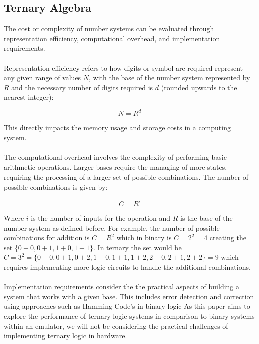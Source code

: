 \documentclass[12pt]{article}
\begin{document}
\subsection{Ternary Algebra}

The cost or complexity of number systems can be evaluated through representation efficiency,
computational overhead, and implementation requirements.\\
\\
Representation efficiency refers to how digits or symbol are required represent any given range of values $N$, with the base of the number system represented 
by $R$ and the necessary number of digits required is $d$ (rounded upwards to the nearest integer):

\begin{equation}
  N = R^{d}
\end{equation}

This directly impacts the memory usage and storage costs in a computing system.\\
\\
The computational overhead involves the complexity of performing basic arithmetic operations. Larger bases require the managing of more states, requiring the 
processing of a larger set of possible combinations. The number of possible combinations is given by:

\begin{equation}
  C = R^{i}
\end{equation}

Where $i$ is the number of inputs for the operation and $R$ is the base of the number system as defined before. For example, the number of possible combinations 
for addition is $C = R^{2}$ which in binary is $C = 2^{2} = 4$ creating the set $\{0+0, 0+1, 1+0, 1+1\}$. 
In ternary the set would be $C = 3^{2} = \{0+0, 0+1, 0+2, 1+0, 1+1, 1+2, 2+0, 2+1, 2+2\} = 9$ which requires implementing more logic circuits to handle the 
additional combinations.\\
\\
Implementation requirements consider the the practical aspects of building a system that works with a given base. This includes 
error detection and correction using approaches such as Hamming Code's in binary logic %
As this paper aims to explore the performance of ternary logic systems in comparison to binary systems within an emulator, we will not be considering 
the practical challenges of implementing ternary logic in hardware.\\
\\
\end{document}
